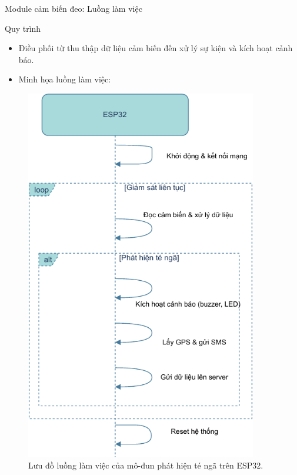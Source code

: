 
\begin{frame}[fragile]{Module cảm biến đeo: Luồng làm việc}
    \begin{block}{Quy trình}
        \begin{itemize}
            \item Điều phối từ thu thập dữ liệu cảm biến đến xử lý sự kiện và kích hoạt cảnh báo.
            \item Minh họa luồng làm việc:
        \end{itemize}
    \end{block}
    \begin{figure}
        \centering
        \includegraphics[width=0.9\textwidth,height=0.5\textheight,keepaspectratio]{images/module1_time_flow.pdf}
        \caption{Lưu đồ luồng làm việc của mô-đun phát hiện té ngã trên ESP32.}
        \label{fig:module1_flow}
    \end{figure}
\end{frame}

